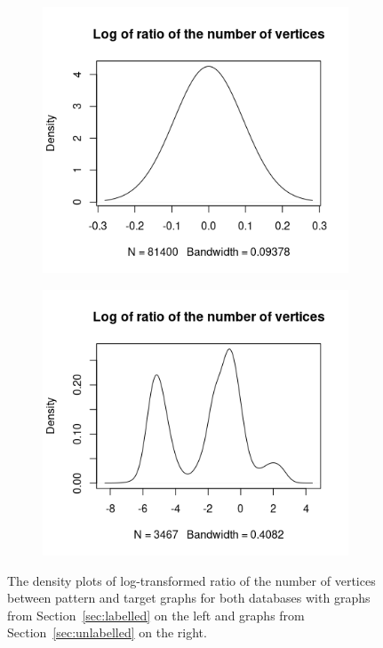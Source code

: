 \documentclass{l4proj}
\theoremstyle{definition}
\theoremstyle{remark}
\begin{document}
\begin{appendices}
  \begin{figure}
    \centering
    \begin{subfigure}[t]{0.49\textwidth}
      \centering
      \includegraphics[width=\textwidth]{images/mcs_ratio_vertices.png}
    \end{subfigure}
    \begin{subfigure}[t]{0.49\textwidth}
      \centering
      \includegraphics[width=\textwidth]{images/sip_ratio_vertices.png}
    \end{subfigure}
    \caption{The density plots of log-transformed ratio of the number of vertices
      between pattern and target graphs for both databases with graphs from
      Section~\ref{sec:labelled} on the left and graphs from
      Section~\ref{sec:unlabelled} on the right.}
    \label{fig:ratio_vertices}
  \end{figure}


\end{appendices}
\end{document}
